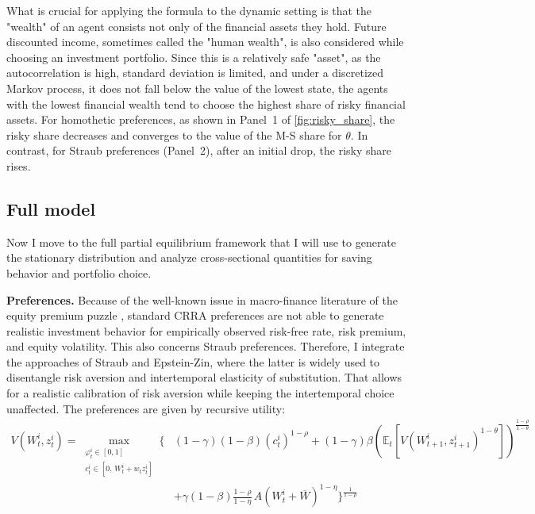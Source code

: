 \documentclass[12pt]{article}
\begin{document}
What is crucial for applying the formula to the dynamic setting is that the "wealth" of an agent consists not only of the financial assets they hold. Future discounted income, sometimes called the "human wealth", is also considered while choosing an investment portfolio. Since this is a relatively safe "asset", as the autocorrelation is high, standard deviation is limited, and under a discretized Markov process, it does not fall below the value of the lowest state, the agents with the lowest financial wealth tend to choose the highest share of risky financial assets. For homothetic preferences, as shown in Panel~1 of \autoref{fig:risky_share}, the risky share decreases and converges to the value of the M-S share for $\theta$. In contrast, for Straub preferences (Panel~2), after an initial drop, the risky share rises.

\subsection{Full model}

Now I move to the full partial equilibrium framework that I will use to generate the stationary distribution and analyze cross-sectional quantities for saving behavior and portfolio choice.

\textbf{Preferences.} Because of the well-known issue in macro-finance literature of the equity premium puzzle \parencite{mehra1985}, standard CRRA preferences are not able to generate realistic investment behavior for empirically observed risk-free rate, risk premium, and equity volatility. This also concerns Straub preferences. Therefore, I integrate the approaches of Straub and Epstein-Zin, where the latter is widely used to disentangle risk aversion and intertemporal elasticity of substitution. That allows for a realistic calibration of risk aversion while keeping the intertemporal choice unaffected. The preferences are given by recursive utility:
\begin{align*}
V\left(W_t^i, z_t^i\right) = \max_{\substack{\varphi_t^i \in [0,1] \\ c_t^i \in [0, \, W_t^i + w_tz_t^i]}} 
\Bigg\{ &
(1 - \gamma)(1 - \beta) \left(c_t^i\right)^{1 - \rho} + (1 - \gamma) \beta 
\left( \mathbb{E}_t \left[ V\left(W_{t+1}^i, z_{t+1}^i\right)^{1 - \theta} \right] \right)^{\frac{1 - \rho}{1 - \theta}} \\
& + \gamma (1 - \beta) \frac{1 - \rho}{1 - \eta} 
\, A \left(W_t^i + \overline{W} \right)^{1 - \eta}
\Bigg\}^{\frac{1}{1 - \rho}}
\end{align*}
\end{document}
